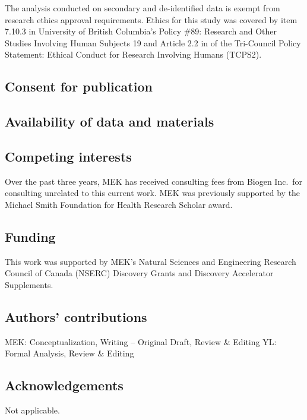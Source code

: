 \documentclass[sn-vancouver,Numbered,lineno,pdflatex]{sn-jnl}
\begin{document}
The analysis conducted on secondary and de-identified data is exempt
from research ethics approval requirements. Ethics for this study was
covered by item 7.10.3 in University of British Columbia's Policy \#89:
Research and Other Studies Involving Human Subjects 19 and Article 2.2
in of the Tri-Council Policy Statement: Ethical Conduct for Research
Involving Humans (TCPS2).

\subsection*{Consent for publication}\label{consent-for-publication}

\subsection*{Availability of data and
materials}\label{availability-of-data-and-materials}

\subsection*{Competing interests}\label{competing-interests}

Over the past three years, MEK has received consulting fees from Biogen
Inc.~for consulting unrelated to this current work. MEK was previously
supported by the Michael Smith Foundation for Health Research Scholar
award.

\subsection*{Funding}\label{funding}

This work was supported by MEK's Natural Sciences and Engineering
Research Council of Canada (NSERC) Discovery Grants and Discovery
Accelerator Supplements.

\subsection*{Authors' contributions}\label{authors-contributions}

MEK: Conceptualization, Writing -- Original Draft, Review \& Editing YL:
Formal Analysis, Review \& Editing

\subsection*{Acknowledgements}\label{acknowledgements}

Not applicable.

\renewcommand\refname{References}

\end{document}
